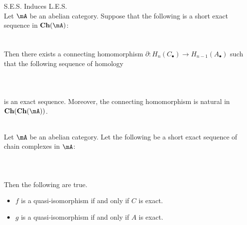 \documentclass[a4paper]{article}
\begin{document}
\begin{thm}{S.E.S. Induces L.E.S.}{}\\
Let $\mA$ be an abelian category. Suppose that the following is a short exact sequence in $\bold{Ch}(\mA)$: \\
\\~\\
Then there exists a connecting homomorphism $\partial:H_n(C_\bullet)\to H_{n-1}(A_\bullet)$ such that the following sequence of homology  \\~\\
\\~\\
is an exact sequence. Moreover, the connecting homomorphism is natural in $\bold{Ch}(\bold{Ch}(\mA))$. 
\end{thm}

\begin{crl}{}{}\\
Let $\mA$ be an abelian category. Let the following be a short exact sequence of chain complexes in $\mA$: \\~\\
\\~\\
Then the following are true. 
\begin{itemize}
\item $f$ is a quasi-isomorphism if and only if $C$ is exact. 
\item $g$ is a quasi-isomorphism if and only if $A$ is exact. 
\end{itemize}
\end{crl}
\end{document}
